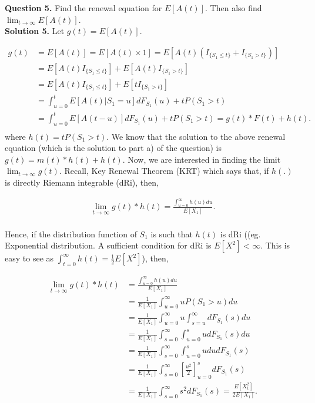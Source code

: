 \documentclass[12,a4paper,onecolumn]{article}
\begin{document}
\textbf{Question 5.} Find the renewal equation for $E[A(t)]$. Then also find $\lim_{t \rightarrow \infty} E[{A(t)}]$.\\

\textbf{Solution 5.} Let $g(t)=E[A(t)].$

\begin{align*}
g(t)&=E[A(t)]=E[A(t)\times 1]=E[A(t)(I_{\{S_1\leq t\}}+I_{\{S_1>t\}})]\\
&=E[A(t)I_{\{S_1\leq t\}}]+E[A(t)I_{\{S_1>t\}}]\\
&=E[A(t)I_{\{S_1\leq t\}}]+E[tI_{\{S_1>t\}}]\\
&=\int_{u=0}^{t}E[A(t)|{S_1= u}]dF_{S_1}(u)+tP(S_1>t)\\
&=\int_{u=0}^{t}E[A(t-u)]dF_{S_1}(u)+tP(S_1>t)=g(t)*F(t)+h(t).\\
\end{align*}
where $h(t)=tP(S_1>t)$. We know that the solution to the above renewal equation (which is the solution to part a) of the question) is $g(t)=m(t)*h(t)+h(t)$. Now, we are interested in finding the limit $\lim_{t \rightarrow \infty} g(t)$. Recall, Key Renewal Theorem (KRT) which says that, if $h(.)$ is directly Riemann integrable (dRi), then, 

\begin{align*}
\lim_{t \rightarrow \infty} g(t)*h(t)=\frac{\int_{u=0}^{\infty}h(u)du}{E[X_1]}.\\
\end{align*}

Hence, if the distribution function of $S_1$ is such that $h(t)$ is dRi ((eg. Exponential distribution. A sufficient condition for dRi is $E[X^2]<\infty$. This is easy to see as $\int_{t=0}^{\infty}h(t)=\frac{1}{2}E[X^2]$), then, 

\begin{align*}
\lim_{t \rightarrow \infty} g(t)*h(t)&=\frac{\int_{u=0}^{\infty}h(u)du}{E[X_1]}\\
&=\frac{1}{E[X_1]}\int_{u=0}^{\infty}uP(S_1>u)du\\
&=\frac{1}{E[X_1]}\int_{u=0}^{\infty}u\int_{s=u}^{\infty}dF_{S_1}(s)du\\
&=\frac{1}{E[X_1]}\int_{s=0}^{\infty}\int_{u=0}^{s}udF_{S_1}(s)du\\
&=\frac{1}{E[X_1]}\int_{s=0}^{\infty}\int_{u=0}^{s}udu dF_{S_1}(s)\\
&=\frac{1}{E[X_1]}\int_{s=0}^{\infty}[\frac{u^2}{2}]_{u=0}^{s} dF_{S_1}(s)\\
&=\frac{1}{E[X_1]}\int_{s=0}^{\infty}s^2 dF_{S_1}(s)=\frac{E[X_1^2]}{2E[X_1]}.\\
\end{align*}
\end{document}
